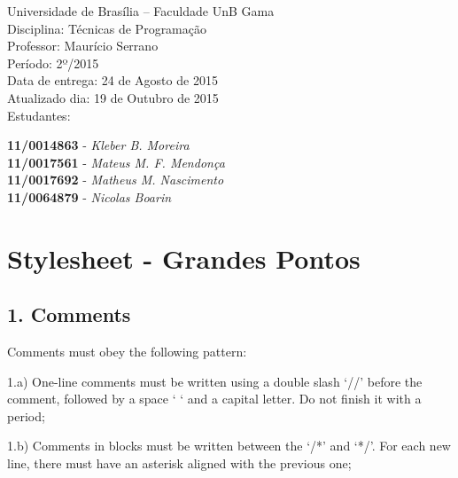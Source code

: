 \documentclass[12pt,openright,a4paper,conference,onecolumn,twoside,english,french,spanish]{IEEEtran}
\begin{document}
Universidade de Brasília -- Faculdade UnB Gama\\Disciplina: Técnicas de
Programação\\Professor: Maurício Serrano\\Período: 2º/2015\\Data de
entrega: 24 de Agosto de 2015\\Atualizado dia: 19 de Outubro de
2015\\Estudantes:

\textbf{11/0014863} - \emph{Kleber B. Moreira}\\\textbf{11/0017561} -
\emph{Mateus M. F. Mendonça}\\\textbf{11/0017692} - \emph{Matheus M.
Nascimento}\\\textbf{11/0064879} - \emph{Nicolas Boarin}

\section{Stylesheet - Grandes Pontos}\label{stylesheet---grandes-pontos}

\subsection{1. Comments}\label{comments}

Comments must obey the following pattern:

1.a) One-line comments must be written using a double slash `//' before
the comment, followed by a space ` ` and a capital letter. Do not finish
it with a period;

\begin{Shaded}
\begin{Highlighting}[]
\end{Highlighting}
\end{Shaded}

1.b) Comments in blocks must be written between the `/*' and `*/'. For
each new line, there must have an asterisk aligned with the previous
one;

\begin{Shaded}
\begin{Highlighting}[]
\CommentTok{/**}
\CommentTok{ */}
\end{Highlighting}
\end{Shaded}
\end{document}
